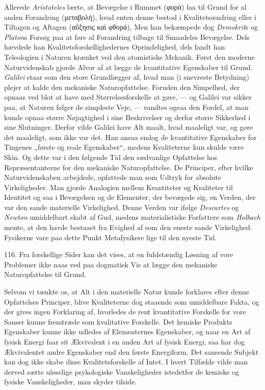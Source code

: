 \documentclass[12pt,a4paper]{book}
\newcommand{\apage}[1]{\marginnote{\footnotesize\textit{[#1]}}}
\begin{document}
Allerede \emph{Aristoteles} lærte, at Bevægelse i Rummet (φορά) laa til Grund for al
anden Forandring (μεταβολή), hvad enten denne bestod i Kvalitetsændring eller i
Tiltagen og Aftagen (αὔξησις καὶ φθορά), Men han bekæmpede dog \emph{Demokrit}s og
\emph{Platon}s Forsøg paa at føre al Forandring tilbage til Smaadeles Bevægelse.
Dels hævdede han Kvalitetsforskellighedernes Oprindelighed, dels fandt han
Teleologien i Naturen krænket ved den atomistiske Mekanik. Først den moderne
Naturvidenskab gjorde Alvor af at lægge de kvantitative Egenskaber til Grund.
\emph{Galilei} staar som den store Grundlægger af, hvad man (i snevreste Betydning)
plejer at kalde den mekaniske Naturopfattelse. Foruden den Simpelhed, der opnaas ved
blot at have med Størrelsesforskelle at gøre, --- og Galilei var sikker paa, at
Naturen følger de simpleste Veje, --- vandtes ogsaa den Fordel, at man kunde opnaa
større Nøjagtighed i sine Beskrivelser og derfor større Sikkerhed i sine
Slutninger. Derfor vilde Galilei have Alt maalt, hvad maaleligt var, og gøre det
maaleligt, som ikke var det. Han ansaa endog de kvantitative Egenskaber for Tingenes
„første og reale Egenskaber“, medens Kvaliteterne kun skulde være Skin. Og dette var
i den følgende Tid den sædvanlige Opfattelse hos Repræsentanterne for den mekaniske
Naturopfattelse. De Principer, efter hvilke Naturvidenskaben arbejdede, opfattede
man som Udtryk for absolute Virkeligheder. Man gjorde Analogien mellem Kvantiteter
og Kvaliteter til Identitet og saa i Bevægelsen og de Elementer, der bevægede sig,
en Verden, der var \apage{277} den sande materielle Virkelighed. Denne Verden var ifølge
\emph{Descartes} og \emph{Newton} umiddelbart skabt af Gud, medens materialistiske
Forfattere som \emph{Holbach} mente, at den havde bestaaet fra Evighed af som den
eneste sande Virkelighed. Fysikerne vare paa dette Punkt Metafysikere lige til den
nyeste Tid.

116. Fra forskellige Sider kan det vises, at en fuldstændig Løsning af vore
Problemer ikke naas ved paa dogmatisk Vis at lægge den mekaniske Naturopfattelse til
Grund.

Selvom vi tænkte os, at Alt i den materielle Natur kunde forklares efter denne
Opfattelses Principer, blive Kvaliteterne dog staaende som umiddelbare Fakta, og der
gives ingen Forklaring af, hvorledes de rent kvantitative Forskelle for vore Sanser
kunne fremtræde som kvalitative Forskelle. Det kemiske Produkts Egenskaber kunne
ikke udledes af Elementernes Egenskaber, og naar en Art af fysisk Energi faar sit
Ækvivalent i en anden Art af fysisk Energi, saa har dog Ækvivalentet andre
Egenskaber end den første Energiform. Det sansende Subjekt kan dog ikke skabe disse
Kvalitetsforskelle af Intet. I hvert Tilfælde vilde man derved sætte uløselige
psykologiske Vanskeligheder istedetfor de kemiske og fysiske Vanskeligheder, man
skyder tilside.
\end{document}
